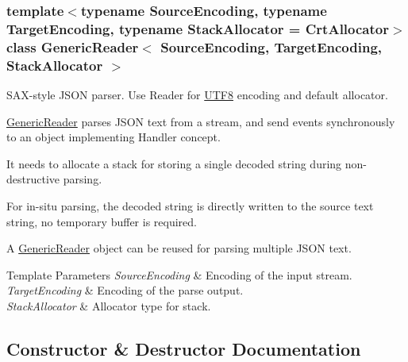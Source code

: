 \subsubsection*{template$<$typename Source\+Encoding, typename Target\+Encoding, typename Stack\+Allocator = Crt\+Allocator$>$\newline
class Generic\+Reader$<$ Source\+Encoding, Target\+Encoding, Stack\+Allocator $>$}

S\+A\+X-\/style J\+S\+ON parser. Use Reader for \hyperlink{structUTF8}{U\+T\+F8} encoding and default allocator. 

\hyperlink{classGenericReader}{Generic\+Reader} parses J\+S\+ON text from a stream, and send events synchronously to an object implementing Handler concept.

It needs to allocate a stack for storing a single decoded string during non-\/destructive parsing.

For in-\/situ parsing, the decoded string is directly written to the source text string, no temporary buffer is required.

A \hyperlink{classGenericReader}{Generic\+Reader} object can be reused for parsing multiple J\+S\+ON text.


\begin{DoxyTemplParams}{Template Parameters}
{\em Source\+Encoding} & Encoding of the input stream. \\
\hline
{\em Target\+Encoding} & Encoding of the parse output. \\
\hline
{\em Stack\+Allocator} & Allocator type for stack. \\
\hline
\end{DoxyTemplParams}


\subsection{Constructor \& Destructor Documentation}
\mbox{\label{classGenericReader_aab875a34b3092df9fb4e2b8eac6dbb96}} 
